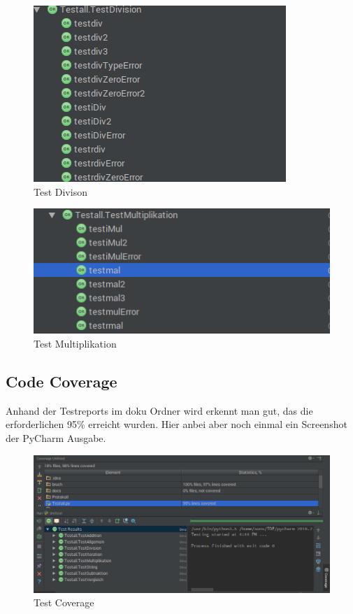 \begin{figure}[!h]
	\begin{center}
		\includegraphics[width=0.6\linewidth]{images/testDiv.png}
		\caption{Test Divison}
		\label{broker}
	\end{center}
\end{figure}
\begin{figure}[!h]
	\begin{center}
		\includegraphics[width=0.6\linewidth]{images/testMul.png}
		\caption{Test Multiplikation}
		\label{broker}
	\end{center}
\end{figure}
\clearpage

\subsection{Code Coverage}
Anhand der Testreports im doku Ordner wird erkennt man gut, das die erforderlichen 95\% erreicht wurden.
Hier anbei aber noch einmal ein Screenshot der PyCharm Ausgabe.

\begin{figure}[!h]
	\begin{center}
		\includegraphics[width=0.9\linewidth]{images/coverage.png}
		\caption{Test Coverage}
		\label{broker}
	\end{center}
\end{figure}


